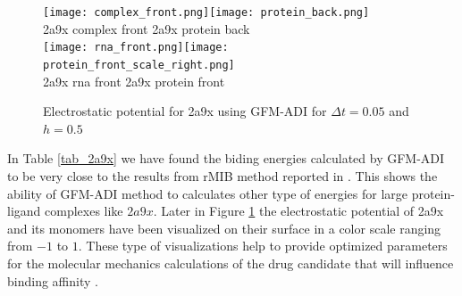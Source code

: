 \begin{figure}[!ht]
	\begin{center}
		\texttt{[image: complex\_front.png]}\texttt{[image: protein\_back.png]}\\
		\hskip 0.5in 2a9x complex front\hskip 2.5in 2a9x  protein back\\
		\texttt{[image: rna\_front.png]}\texttt{[image: protein\_front\_scale\_right.png]}\\
		\hskip 0.7in 2a9x rna front\hskip 2.8in 2a9x  protein front\\
		\caption{Electrostatic potential for 2a9x using GFM-ADI for $\Delta t = 0.05$ and $h = 0.5$}
		\label{fig:2a9x}
	\end{center}
\end{figure}


In Table \ref{tab_2a9x} we have found the biding energies calculated by GFM-ADI to be very close to the results from rMIB method reported in \cite{Geng2017a}. This shows the ability of GFM-ADI method to calculates other type of energies for large protein-ligand complexes like $2a9x$. Later in Figure \ref{fig:2a9x} the electrostatic potential of 2a9x and its monomers have been visualized on their surface in a color scale ranging from $-1$ to $1$. These type of visualizations help to provide optimized parameters for the molecular mechanics calculations of the drug candidate that will influence binding affinity \cite{drug2012}.      




